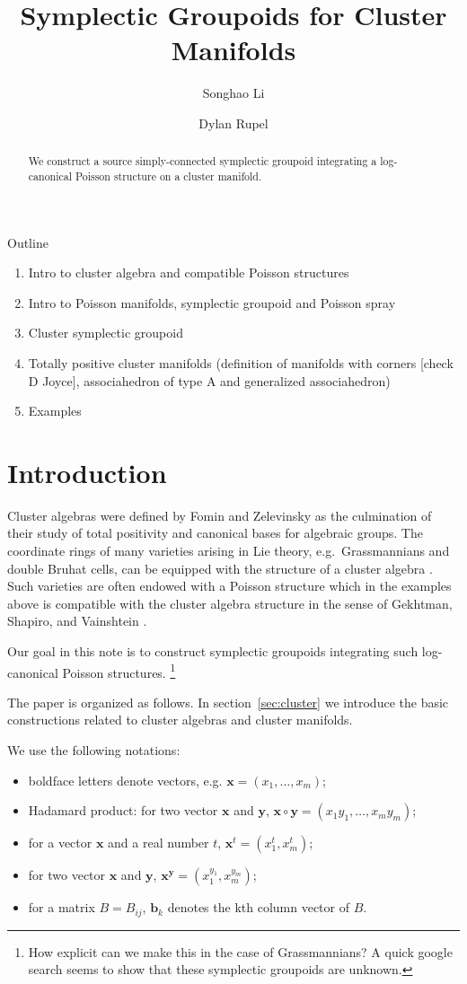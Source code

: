 \documentclass{amsart}
\title{Symplectic Groupoids for Cluster Manifolds}
\author{Songhao Li}
\author{Dylan Rupel}
\newcommand{\bfb}{\mathbf{b}}
\newcommand{\bfx}{\mathbf{x}}
\newcommand{\bfy}{\mathbf{y}}
\begin{document}
\begin{abstract}
  We construct a source simply-connected symplectic groupoid integrating a log-canonical Poisson structure on a cluster manifold.
\end{abstract}
\maketitle
Outline
\begin{enumerate}
	\item Intro to cluster algebra and compatible Poisson structures 
	\item Intro to Poisson manifolds, symplectic groupoid and Poisson spray
	\item Cluster symplectic groupoid
	\item Totally positive cluster manifolds (definition of manifolds with corners [check D Joyce], associahedron of type A and generalized associahedron)
	\item Examples
\end{enumerate}

\section{Introduction}
Cluster algebras were defined by Fomin and Zelevinsky \cite{fomin-zelevinsky1} as the culmination of their study of total positivity and canonical bases for algebraic groups.
The coordinate rings of many varieties arising in Lie theory, e.g.\ Grassmannians and double Bruhat cells, can be equipped with the structure of a cluster algebra \cite{berenstein-fomin-zelevinsky,scott,gekhtman-shapiro-vainshtein,williams}.
Such varieties are often endowed with a Poisson structure which in the examples above is compatible with the cluster algebra structure in the sense of Gekhtman, Shapiro, and Vainshtein \cite{gsv}.

Our goal in this note is to construct symplectic groupoids integrating such log-canonical Poisson structures.
\footnote{How explicit can we make this in the case of Grassmannians?  A quick google search seems to show that these symplectic groupoids are unknown.}



The paper is organized as follows.
In section~\ref{sec:cluster} we introduce the basic constructions related to cluster algebras and cluster manifolds.

We use the following notations:
\begin{itemize}
	\item boldface letters denote vectors, e.g. $\bfx = (x_1, \ldots, x_m)$;
	\item Hadamard product: for two vector $\bfx$ and $\bfy$, $\bfx \circ \bfy = (x_1y_1, \ldots, x_my_m)$;
	\item for a vector $\bfx$ and a real number $t$, $\bfx^t = (x_1^t, x_m^t)$;
	\item for two vector $\bfx$ and $\bfy$, $\bfx^\bfy = (x_1^{y_1}, x_m^{y_m})$;
	\item for a matrix $B = B_{ij}$, $\bfb_k$ denotes the kth column vector of $B$.
\end{itemize}
\end{document}

